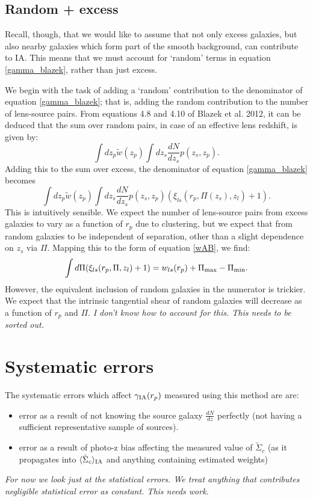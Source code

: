 \documentclass[onecolumn,amsmath,aps,fleqn, superscriptaddress]{revtex4}
\begin{document}
\subsection*{Random + excess}
Recall, though, that we would like to assume that not only excess galaxies, but also nearby galaxies which form part of the smooth background, can contribute to IA. This means that we must account for `random' terms in equation \ref{gamma_blazek}, rather than just excess.

We begin with the task of adding a `random' contribution to the denominator of equation \ref{gamma_blazek}; that is, adding the random contribution to the number of lens-source pairs. From equations 4.8 and 4.10 of Blazek et al. 2012, it can be deduced that the sum over random pairs, in case of an effective lens redshift, is given by:
\begin{equation}
\int dz_p \tilde{w}(z_p) \int dz_s \frac{dN}{dz_s} p(z_s, z_p).
\end{equation}
Adding this to the sum over excess, the denominator of equation \ref{gamma_blazek} becomes
\begin{equation}
\int dz_p \tilde{w}(z_p) \int dz_s \frac{dN}{dz_s} p(z_s, z_p) \left(\xi_{ls}(r_p, \Pi(z_s), z_l) + 1\right).
\label{denom_rand}
\end{equation}
This is intuitively sensible. We expect the number of lens-source pairs from excess galaxies to vary as a function of $r_p$ due to clustering, but we expect that from random galaxies to be independent of separation, other than a slight dependence on $z_s$ via $\Pi$. Mapping this to the form of equation \ref{wAB}, we find:
\begin{equation}
\int d\Pi (\xi_{ls}(r_p, \Pi, z_l) + 1) = w_{ls}(r_p) + \Pi_{\rm max} - \Pi_{\rm min}.
\label{wl}
\end{equation}
However, the equivalent inclusion of random galaxies in the numerator is trickier. We expect that the intrinsic tangential shear of random galaxies will decrease as a function of $r_p$ and $\Pi$. {\it I don't know how to account for this. This needs to be sorted out.} 

\section{Systematic errors}
The systematic errors which affect $\gamma_{\rm IA}(r_p)$ measured using this method are are:
\begin{itemize}
\item{error as a result of not knowing the source galaxy $\frac{dN}{dz}$ perfectly (not having a sufficient representative sample of sources).}
\item{error as a result of photo-z bias affecting the measured value of $\tilde{\Sigma}_c$ (as it propagates into $\langle \tilde{\Sigma}_c\rangle_{\rm IA}$ and anything containing estimated weights)}
\end{itemize}
{\it For now we look just at the statistical errors. We treat anything that contributes negligible statistical error as constant. This needs work.}
\end{document}
